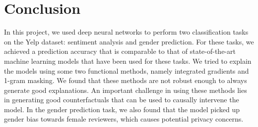 \section{Conclusion}

In this project, we used deep neural networks to perform two classification tasks on the Yelp dataset: sentiment analysis and gender prediction. For these tasks, we achieved a prediction accuracy that is comparable to that of state-of-the-art machine learning models that have been used for these tasks. We tried to explain the models using some two functional methods, namely integrated gradients and 1-gram masking. We found that these methods are not robust enough to always generate good explanations. An important challenge in using these methods lies in generating good counterfactuals that can be used to causally intervene the model. In the gender prediction task, we also found that the model picked up gender bias towards female reviewers, which causes potential privacy concerns.
